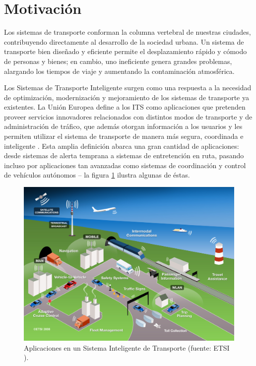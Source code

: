 \section{Motivación}

Los sistemas de transporte conforman la columna vertebral de nuestras ciudades, contribuyendo directamente al desarrollo de la sociedad urbana. Un sistema de transporte bien diseñado y eficiente permite el desplazamiento rápido y cómodo de personas y bienes; en cambio, uno ineficiente genera grandes problemas, alargando los tiempos de viaje y aumentando la contaminación atmosférica.

Los Sistemas de Transporte Inteligente surgen como una respuesta a la necesidad de optimización, modernización y mejoramiento de los sistemas de transporte ya existentes. La Unión Europea define a los ITS como aplicaciones que pretenden proveer servicios innovadores relacionados con distintos modos de transporte y de administración de tráfico, que además otorgan información a los usuarios y les permiten utilizar el sistema de transporte de manera más segura, coordinada e inteligente \cite{eudirective}. Esta amplia definición abarca una gran cantidad de aplicaciones: desde sistemas de alerta temprana a sistemas de entretención en ruta, pasando incluso por aplicaciones tan avanzadas como sistemas de coordinación y control de vehículos autónomos -- la figura \ref{fig:itsetsi} ilustra algunas de éstas. 

\begin{figure}[tpb]
    \centering
    \includegraphics[width=0.9\linewidth]{figuras/ITS.png}
    \caption{Aplicaciones en un Sistema Inteligente de Transporte (fuente: ETSI \autocite{etsi}).}
    \label{fig:itsetsi}
\end{figure}

